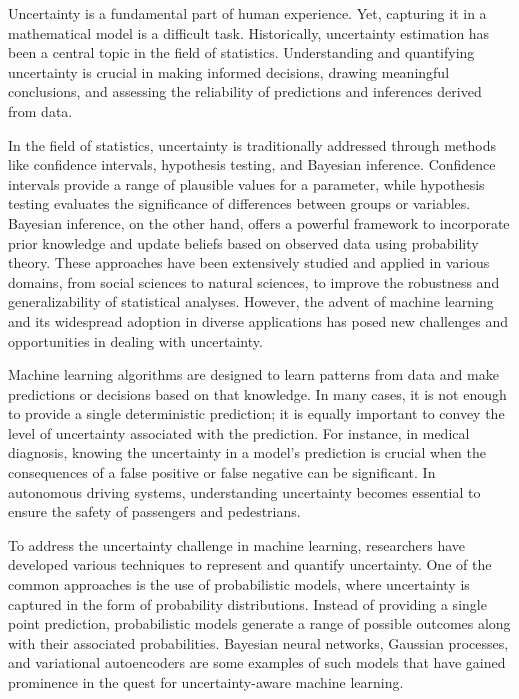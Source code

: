 Uncertainty is a fundamental part of human experience. Yet, capturing it in a mathematical model is a difficult task. Historically, uncertainty estimation has been a central topic in the field of statistics. Understanding and quantifying uncertainty is crucial in making informed decisions, drawing meaningful conclusions, and assessing the reliability of predictions and inferences derived from data.


In the field of statistics, uncertainty is traditionally addressed through methods like confidence intervals, hypothesis testing, and Bayesian inference. Confidence intervals provide a range of plausible values for a parameter, while hypothesis testing evaluates the significance of differences between groups or variables. Bayesian inference, on the other hand, offers a powerful framework to incorporate prior knowledge and update beliefs based on observed data using probability theory. These approaches have been extensively studied and applied in various domains, from social sciences to natural sciences, to improve the robustness and generalizability of statistical analyses.
However, the advent of machine learning and its widespread adoption in diverse applications has posed new challenges and opportunities in dealing with uncertainty. 

Machine learning algorithms are designed to learn patterns from data and make predictions or decisions based on that knowledge. In many cases, it is not enough to provide a single deterministic prediction; it is equally important to convey the level of uncertainty associated with the prediction. For instance, in medical diagnosis, knowing the uncertainty in a model's prediction is crucial when the consequences of a false positive or false negative can be significant. In autonomous driving systems, understanding uncertainty becomes essential to ensure the safety of passengers and pedestrians.

To address the uncertainty challenge in machine learning, researchers have developed various techniques to represent and quantify uncertainty. One of the common approaches is the use of probabilistic models, where uncertainty is captured in the form of probability distributions. Instead of providing a single point prediction, probabilistic models generate a range of possible outcomes along with their associated probabilities. Bayesian neural networks, Gaussian processes, and variational autoencoders are some examples of such models that have gained prominence in the quest for uncertainty-aware machine learning.

